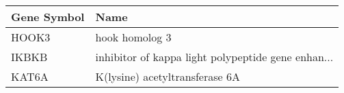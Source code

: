 \begin{tabular}{ll}
\toprule
Gene Symbol &                                               Name \\
\midrule
      HOOK3 &                                     hook homolog 3 \\
      IKBKB & inhibitor of kappa light polypeptide gene enhan... \\
      KAT6A &                     K(lysine) acetyltransferase 6A \\
\bottomrule
\end{tabular}
